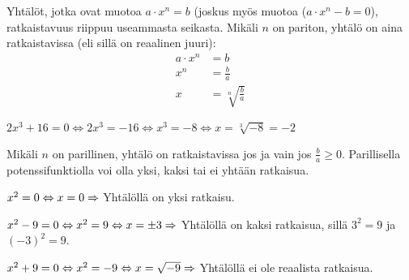 Yhtälöt, jotka ovat muotoa $a\cdot x^n = b$ (joskus myös muotoa ($a\cdot x^n - b = 0$), ratkaistavuus riippuu useammasta seikasta. Mikäli $n$ on pariton, yhtälö on aina ratkaistavissa (eli sillä on reaalinen juuri):
\begin{align*}
a\cdot x^n &= b \\
x^n &= \frac{b}{a} \\
x &= \sqrt[n]{\frac{b}{a}}
\end{align*}

\begin{esimerkki}
$2x^3 + 16 = 0 \Leftrightarrow 2x^3 = -16 \Leftrightarrow x^3 = -8  \Leftrightarrow x = \sqrt[3]{-8} = -2 $
\end{esimerkki}

Mikäli $n$ on parillinen, yhtälö on ratkaistavissa jos ja vain jos $\frac{b}{a} \geq 0 $. Parillisella potenssifunktiolla voi olla yksi, kaksi tai ei yhtään ratkaisua.

\begin{esimerkki}
$x^2 = 0 \Leftrightarrow x = 0 \\
\Rightarrow$ Yhtälöllä on yksi ratkaisu.
\end{esimerkki}

\begin{esimerkki}
$x^2 - 9 = 0 \Leftrightarrow x^2 = 9 \Leftrightarrow x = \pm 3 \\
\Rightarrow$ Yhtälöllä on kaksi ratkaisua, sillä $3^2 = 9$ ja $(-3)^2 = 9$.
\end{esimerkki}

\begin{esimerkki}
$x^2 + 9 = 0 \Leftrightarrow x^2 = -9 \Leftrightarrow x = \sqrt{-9} \\
\Rightarrow$ Yhtälöllä ei ole reaalista ratkaisua.
\end{esimerkki}


